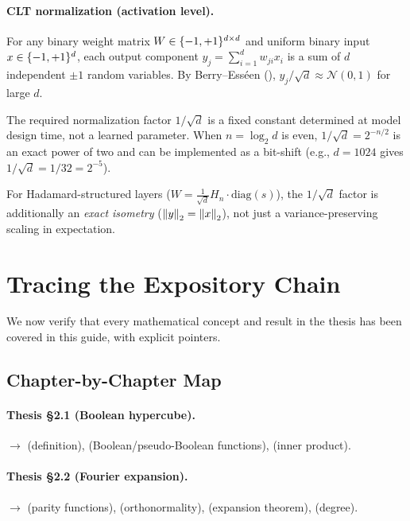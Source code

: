 \paragraph{CLT normalization (activation level).}
For any binary weight matrix $W \in \{-1,+1\}^{d \times d}$ and uniform
binary input $x \in \{-1,+1\}^d$, each output component
$y_j = \sum_{i=1}^d w_{ji} x_i$ is a sum of $d$ independent $\pm 1$
random variables. By Berry--Ess\'een (),
$y_j / \sqrt{d} \approx \mathcal{N}(0, 1)$ for large $d$.

The required normalization factor $1/\sqrt{d}$ is a fixed constant
determined at model design time, not a learned parameter. When $n = \log_2 d$ is even, $1/\sqrt{d} = 2^{-n/2}$ is an exact
power of two and can be implemented as a bit-shift (e.g., $d = 1024$
gives $1/\sqrt{d} = 1/32 = 2^{-5}$).

For Hadamard-structured layers ($W = \frac{1}{\sqrt{d}} H_n \cdot \text{diag}(s)$),
the $1/\sqrt{d}$ factor is additionally an \emph{exact isometry}
($\left\| y \right\|_2 = \left\| x \right\|_2$), not just a variance-preserving scaling in
expectation.


\section{Tracing the Expository Chain}\label{sec:chain}

We now verify that every mathematical concept and result in the thesis
has been covered in this guide, with explicit pointers.

\subsection{Chapter-by-Chapter Map}\label{sec:chapter-map}

\paragraph{Thesis \S2.1 (Boolean hypercube).}
$\to$  (definition), 
(Boolean/pseudo-Boolean functions), 
(inner product).

\paragraph{Thesis \S2.2 (Fourier expansion).}
$\to$  (parity functions), 
(orthonormality),  (expansion theorem),
 (degree).

